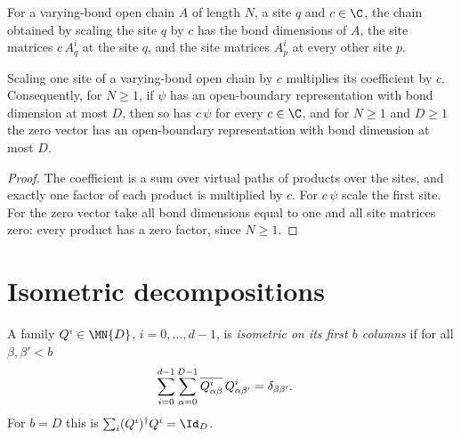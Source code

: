 \begin{definition}
    \label{def:seqanc_smul_site}
    \leanok
    For a varying-bond open chain $A$ of length $N$, a site $q$ and $c\in\C$,
    the chain obtained by scaling the site $q$ by $c$ has the bond dimensions of
    $A$, the site matrices $c\,A_q^i$ at the site $q$, and the site matrices
    $A_p^i$ at every other site $p$.
\end{definition}

\begin{lemma}
    \label{thm:seqanc_obc_cone}
    \leanok
    Scaling one site of a varying-bond open chain by $c$ multiplies its
    coefficient by $c$. Consequently, for $N\ge 1$, if $\psi$ has an
    open-boundary representation with bond dimension at most $D$, then so has
    $c\,\psi$ for every $c\in\C$, and for $N\ge 1$ and $D\ge 1$ the zero vector
    has an open-boundary representation with bond dimension at most $D$.
\end{lemma}
\begin{proof}
    \leanok
    The coefficient is a sum over virtual paths of products over the sites, and
    exactly one factor of each product is multiplied by $c$. For $c\,\psi$
    scale the first site. For the zero vector take all bond dimensions equal to
    one and all site matrices zero: every product has a zero factor, since
    $N\ge 1$.
\end{proof}

\section{Isometric decompositions}

\begin{definition}
    \label{def:seqanc_isometry_on}
    \leanok
    A family $Q^i\in\MN{D}$, $i=0,\dots,d-1$, is \emph{isometric on its first
        $b$ columns} if for all $\beta,\beta'<b$
    \begin{align}
        \sum_{i=0}^{d-1}\sum_{\alpha=0}^{D-1}
        \overline{Q^i_{\alpha\beta}}\,Q^i_{\alpha\beta'}
         & =\delta_{\beta\beta'}.
        \notag
    \end{align}
    For $b=D$ this is $\sum_i(Q^i)^\dagger Q^i=\Id_D$.
\end{definition}

